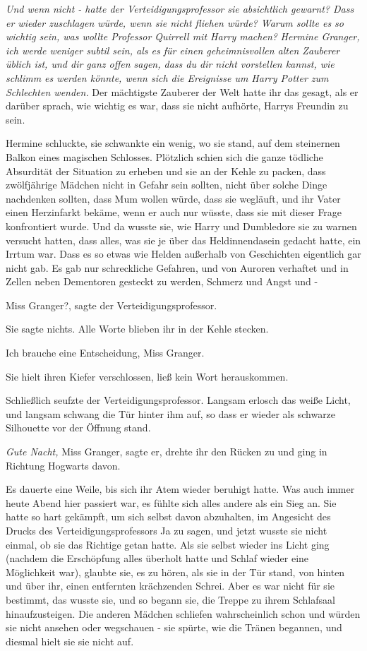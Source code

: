 \emph{Und wenn nicht - hatte der Verteidigungsprofessor sie absichtlich gewarnt? Dass er wieder zuschlagen würde, wenn sie nicht fliehen würde? Warum sollte es so wichtig sein, was wollte Professor Quirrell mit Harry machen? }
\emph{Hermine Granger, ich werde weniger subtil sein, als es für einen geheimnisvollen alten Zauberer üblich ist, und dir ganz offen sagen, dass du dir nicht vorstellen kannst, wie schlimm es werden könnte, wenn sich die Ereignisse um Harry Potter zum Schlechten wenden.}
Der mächtigste Zauberer der Welt hatte ihr das gesagt, als er darüber sprach,
wie wichtig es war, dass sie nicht aufhörte, Harrys Freundin zu sein.

Hermine schluckte, sie schwankte ein wenig, wo sie stand, auf dem steinernen
Balkon eines magischen Schlosses. Plötzlich schien sich die ganze tödliche
Absurdität der Situation zu erheben und sie an der Kehle zu packen, dass
zwölfjährige Mädchen nicht in Gefahr sein sollten, nicht über solche Dinge
nachdenken sollten, dass Mum wollen würde, dass sie wegläuft, und ihr Vater
einen Herzinfarkt bekäme, wenn er auch nur wüsste, dass sie mit dieser Frage
konfrontiert wurde. Und da wusste sie, wie Harry und Dumbledore sie zu warnen
versucht hatten, dass alles, was sie je über das Heldinnendasein gedacht hatte,
ein Irrtum war. Dass es so etwas wie Helden außerhalb von Geschichten eigentlich
gar nicht gab. Es gab nur schreckliche Gefahren, und von Auroren verhaftet und
in Zellen neben Dementoren gesteckt zu werden, Schmerz und Angst und -

\glqq Miss Granger?\grqq{}, sagte der Verteidigungsprofessor.

Sie sagte nichts. Alle Worte blieben ihr in der Kehle stecken.

\glqq Ich brauche eine Entscheidung, Miss Granger.\grqq{}

Sie hielt ihren Kiefer verschlossen, ließ kein Wort herauskommen.

Schließlich seufzte der Verteidigungsprofessor. Langsam erlosch das weiße Licht,
und langsam schwang die Tür hinter ihm auf, so dass er wieder als schwarze
Silhouette vor der Öffnung stand.

\glqq \emph{Gute Nacht,} Miss Granger\grqq{}, sagte er, drehte ihr den Rücken zu
und ging in Richtung Hogwarts davon.

Es dauerte eine Weile, bis sich ihr Atem wieder beruhigt hatte. Was auch immer
heute Abend hier passiert war, es fühlte sich alles andere als ein Sieg an. Sie
hatte so hart gekämpft, um sich selbst davon abzuhalten, im Angesicht des Drucks
des Verteidigungsprofessors Ja zu sagen, und jetzt wusste sie nicht einmal, ob
sie das Richtige getan hatte. Als sie selbst wieder ins Licht ging (nachdem die
Erschöpfung alles überholt hatte und Schlaf wieder eine Möglichkeit war),
glaubte sie, es zu hören, als sie in der Tür stand, von hinten und über ihr,
einen entfernten krächzenden Schrei. Aber es war nicht für sie bestimmt, das
wusste sie, und so begann sie, die Treppe zu ihrem Schlafsaal hinaufzusteigen.
Die anderen Mädchen schliefen wahrscheinlich schon und würden sie nicht ansehen
oder wegschauen - sie spürte, wie die Tränen begannen, und diesmal hielt sie sie
nicht auf.

